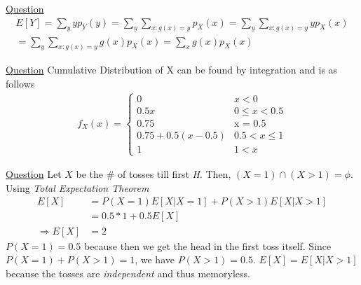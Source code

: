 \documentclass[11pt, a4paper]{article}
\begin{document}
\begin{enumerate}
        \hypertarget{a_expfn}{\item} \hyperlink{q_expfn}{Question}
        \begin{align*}
            E[Y] = \sum_{y}yp_Y(y) = \sum_{y}\sum_{x:g(x)=y}p_{X}(x) = \sum_{y} \sum_{x:g(x)=y} yp_{X}(x)\\
            = \sum_{y} \sum_{x:g(x)=y}g(x)p_{X}(x) = \sum_{x}g(x)p_{X}(x) 
        \end{align*}
    
        \hypertarget{a_cumuldistfn}{\item} \hyperlink{q_cumuldistfn}{Question} \newline
        Cumulative Distribution of X can be found by integration and is as follows
        \begin{align*}
            f_{X}(x) = \begin{cases} 0 &\mbox{$x < 0$}\\
                                     0.5x &\mbox{$0 \leq x < 0.5$}\\
                                     0.75 &\mbox{x = 0.5}\\
                                     0.75 + 0.5(x-0.5) &\mbox{$0.5 < x \leq 1$} \\
                                     1 &\mbox {$1 < x$}\end{cases}
        \end{align*}
        
        \hypertarget{a_tossh}{\item} \hyperlink{q_tossh}{Question} \newline
        Let $X$ be the \# of tosses till first \emph{H}. Then, $(X = 1) \cap (X > 1) = \phi$.
        Using \emph{Total Expectation Theorem}
        \begin{align*}
            E[X] &= P(X = 1)E[X|X = 1] + P(X > 1)E[X|X > 1] \\
            &= 0.5 * 1 + 0.5 E[X] \\
            \Rightarrow E[X] &= 2
        \end{align*}
        $P(X = 1) = 0.5$ because then we get the head in the first toss itself. Since $P(X = 1) + P(X > 1) = 1$, we have $P(X > 1) = 0.5$. $E[X] = E[X|X > 1]$ because the tosses are \emph{independent} and thus memoryless.


\end{enumerate}
\end{document}
